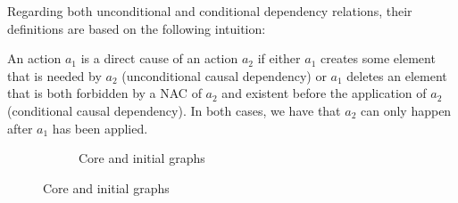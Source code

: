 Regarding both unconditional and conditional dependency relations, their definitions are based on the following intuition:

\begin{intuition} An action $a_1$ is a direct cause of an action $a_2$ if either $a_1$ creates some element that is needed by $a_2$ (unconditional causal dependency) or $a_1$ deletes an element that is both forbidden by a NAC of $a_2$ and existent before the application of $a_2$ (conditional causal dependency). In both cases, we have that $a_2$ can only happen after $a_1$ has been applied. 
\end{intuition}

\begin{figure}[!ht]
  \centering
  \begin{subfigure}[t]{.5\textwidth}
    \centerline{}
    \caption{Core and initial graphs}\label{fig:process:unconditional-relation:core-graph}
  \end{subfigure}


\end{figure}
